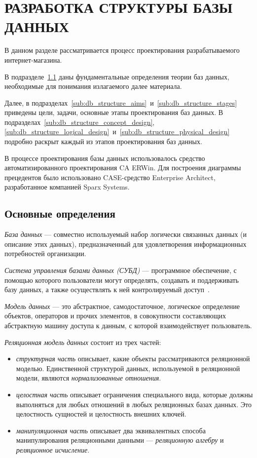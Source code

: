 \section[Разработка структуры БД]{РАЗРАБОТКА СТРУКТУРЫ БАЗЫ ДАННЫХ}
\label{sect:db_structure}

В данном разделе рассматривается процесс проектирования разрабатываемого
интернет-магазина.

В подразделе~\ref{sub:db_structure_theory} даны фундаментальные определения теории
баз данных, необходимые для понимания излагаемого далее материала.

Далее, в подразделах~\ref{sub:db_structure_aims}~и~\ref{sub:db_structure_stages}
приведены цели, задачи, основные этапы проектирования баз данных.
В подразделах~\ref{sub:db_structure_concept_design},
\ref{sub:db_structure_logical_design}~и~\ref{sub:db_structure_physical_design}
подробно раскрыт каждый из этапов проектирования баз данных.

В процессе проектирования базы данных использовалось средство автоматизированного
проектирования CA ERWin.
Для построения диаграммы прецедентов было использовано CASE-средство
Enterprise Architect, разработанное компанией Sparx Systems.

\subsection{Основные определения}
\label{sub:db_structure_theory}

\textit{База данных} --- совместно используемый набор логически связанных данных
(и описание этих данных), предназначенный для удовлетворения информационных
потребностей организации.

\textit{Система управления базами данных (СУБД)} --- программное обеспечение,
с помощью которого пользователи могут определять, создавать и поддерживать базу данных,
а также осуществлять к ней контролируемый доступ~\cite{konnolli03}.

\textit{Модель данных} --- это абстрактное, самодостаточное,
логическое определение объектов, операторов и прочих элементов,
в совокупности составляющих абстрактную  машину доступа к данным,
с которой взаимодействует пользователь.

\textit{Реляционная модель данных} состоит из трех частей:
\begin{itemize}
\item
  \textit{структурная часть} описывает, какие объекты рассматриваются
  реляционной моделью. Единственной структурой данных, используемой
  в реляционной модели, являются \textit{нормализованные отношения}.
\item
  \textit{целостная часть} описывает ограничения специального вида,
  которые должны выполняться для любых отношений в любых реляционных базах данных.
  Это целостность сущностей и целостность внешних ключей.
\item
  \textit{манипуляционная часть} описывает два эквивалентных способа
  манипулирования реляционными данными --- \textit{реляционную алгебру} и
  \textit{реляционное исчисление}.
\end{itemize}

